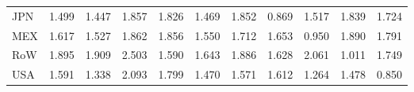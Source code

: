 \begin{table}[htbp]
\begin{tabular}{lcccccccccc}
  JPN & \textcolor[RGB]{189,122,66}{1.499} & \textcolor[RGB]{207,134,48}{1.447} & \textcolor[RGB]{61,40,194}{1.857} & \textcolor[RGB]{79,51,176}{1.826} & \textcolor[RGB]{199,129,56}{1.469} & \textcolor[RGB]{66,43,189}{1.852} & \textcolor[RGB]{247,160,8}{0.869} & \textcolor[RGB]{186,120,69}{1.517} & \textcolor[RGB]{74,48,181}{1.839} & \textcolor[RGB]{120,78,135}{1.724} \\ 
  MEX & \textcolor[RGB]{148,96,107}{1.617} & \textcolor[RGB]{184,119,71}{1.527} & \textcolor[RGB]{56,36,199}{1.862} & \textcolor[RGB]{64,41,191}{1.856} & \textcolor[RGB]{176,114,79}{1.550} & \textcolor[RGB]{125,81,130}{1.712} & \textcolor[RGB]{133,86,122}{1.653} & \textcolor[RGB]{237,153,18}{0.950} & \textcolor[RGB]{51,33,204}{1.890} & \textcolor[RGB]{97,63,158}{1.791} \\ 
  RoW & \textcolor[RGB]{48,31,207}{1.895} & \textcolor[RGB]{46,30,209}{1.909} & \textcolor[RGB]{5,3,250}{2.503} & \textcolor[RGB]{161,104,94}{1.590} & \textcolor[RGB]{140,91,115}{1.643} & \textcolor[RGB]{54,35,201}{1.886} & \textcolor[RGB]{145,94,110}{1.628} & \textcolor[RGB]{20,13,235}{2.061} & \textcolor[RGB]{232,150,23}{1.011} & \textcolor[RGB]{107,69,148}{1.749} \\ 
  USA & \textcolor[RGB]{158,102,97}{1.591} & \textcolor[RGB]{224,145,31}{1.338} & \textcolor[RGB]{15,10,240}{2.093} & \textcolor[RGB]{84,54,171}{1.799} & \textcolor[RGB]{196,127,59}{1.470} & \textcolor[RGB]{168,109,87}{1.571} & \textcolor[RGB]{150,97,105}{1.612} & \textcolor[RGB]{227,147,28}{1.264} & \textcolor[RGB]{194,125,61}{1.478} & \textcolor[RGB]{252,163,3}{0.850} \\ 
   \hline
\end{tabular}
\end{table}
